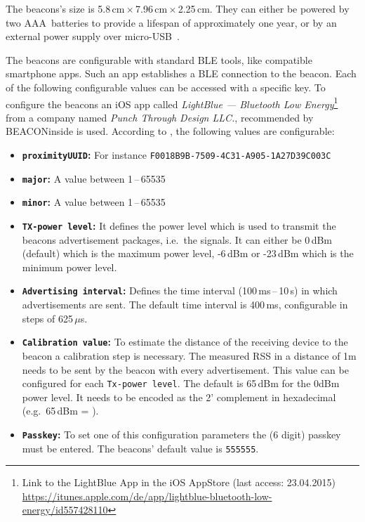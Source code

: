 The beacons's size is 5.8\,cm\,$\times$\,7.96\,cm\,$\times$\,2.25\,cm. They can either be powered by two AAA~batteries to provide a lifespan of approximately one year, or by an external power supply over micro-USB~\citep{binside:ds}.

The beacons are configurable with standard \ac{BLE} tools, like compatible smartphone apps. Such an app establishes a \ac{BLE} connection to the beacon. Each of the following configurable values can be accessed with a specific key. To configure the beacons an iOS app called \emph{LightBlue --- Bluetooth Low Energy}\footnote{Link to the LightBlue App in the iOS AppStore (last access: 23.04.2015) \url{https://itunes.apple.com/de/app/lightblue-bluetooth-low-energy/id557428110}} from a company named \emph{Punch Through Design LLC.}, recommended by BEACONinside is used. According to \citet{binside:ds}, the following values are configurable:
\begin{itemize}
  \item \textbf{\texttt{proximityUUID}:} For instance \texttt{F0018B9B-7509-4C31-A905-1A27D39C003C}
  \item \textbf{\texttt{major}:} A value between 1\,--\,65535
  \item \textbf{\texttt{minor}:} A value between 1\,--\,65535
  \item \textbf{\texttt{\acs{TX}-power level}:} It defines the power level which is used to transmit the beacons advertisement packages, i.e.\ the signals. It can either be 0\,dBm (default) which is the maximum power level, -6\,dBm or -23\,dBm which is the minimum power level.
  \item \textbf{\texttt{Advertising interval}:} Defines the time interval (100\,ms\,--\,10\,s) in which advertisements are sent. The default time interval is 400\,ms, configurable in steps of 625\,$\mu$s.
  \item \textbf{\texttt{Calibration value}:} To estimate the distance of the receiving device to the beacon a calibration step is necessary. The measured \acs{RSS} in a distance of 1m needs to be sent by the beacon with every advertisement. This value can be configured for each \texttt{Tx-power level}. The default is 65\,dBm for the 0dBm power level. It needs to be encoded as the 2' complement in hexadecimal (e.g.\ 65\,dBm = ).
  \item \textbf{\texttt{Passkey}:} To set one of this configuration parameters the (6 digit) passkey must be entered. The beacons' default value is \texttt{555555}.
\end{itemize}

